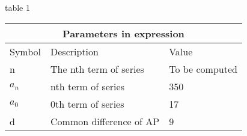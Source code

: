 \setlength{\arrayrulewidth}{0.3mm}
\setlength{\tabcolsep}{15pt}
\renewcommand{\arraystretch}{1.5}

table 1\\

\begin{tabular}{ |p{1cm}|p{3cm}|p{1cm}| }
\hline
\multicolumn{3}{|c|}{Parameters in expression}\\
\hline
Symbol & Description & Value\\
\hline
n & The nth term of series & To be computed\\
\hline
$a_n$ & nth term of series & 350\\
\hline
$a_0$ & 0th term of series & 17 \\
\hline
d & Common difference of AP & 9\\
\hline
\end{tabular}

